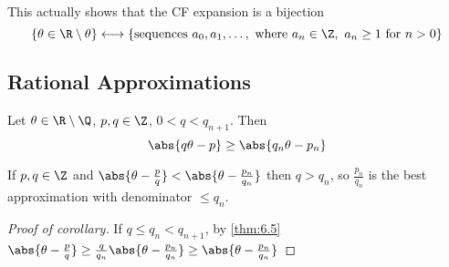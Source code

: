 \documentclass{article}
\begin{document}
\begin{remark}
    This actually shows that the CF expansion is a bijection
    \begin{equation*}
        \{ \theta \in \R \setminus \theta\} \longleftrightarrow \{ \text{sequences } a_0, a_1, \dotsc,\text{ where } a_n \in \Z, \ a_n \geq 1 \text{ for } n > 0\}
    \end{equation*}
\end{remark}

\subsection{Rational Approximations}
\begin{nthm}\label{thm:6.5}
    Let $\theta \in \R \setminus \Q$, $p, q \in \Z$, $0 < q < q_{n+1}$. Then
    \begin{equation*}
        \abs{q \theta - p} \geq \abs{q_n \theta - p_n}
    \end{equation*}
\end{nthm}

\begin{cor}
    If $p, q \in \Z$ and $\abs{\theta - \frac{p}{q}} < \abs{\theta - \frac{p_n}{q_n}}$ then $q > q_n$, so
    $\frac{p_n}{q_n}$ is the best approximation with denominator $\leq q_n$.
\end{cor}

\begin{proof}[Proof of corollary]
    If $q \leq q_n < q_{n+1}$, by \cref{thm:6.5} $\abs{\theta - \frac{p}{q}} \geq \frac{q}{q_n} \abs{\theta - \frac{p_n}{q_n}} \geq \abs{\theta - \frac{p_n}{q_n}}$
\end{proof}
\end{document}
